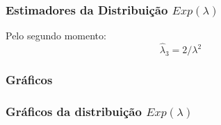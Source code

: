 \begin{frame}
\frametitle{Estimadores da Distribuição $Exp(\lambda)$}
Pelo segundo momento:
\begin{equation}
\label{eq:Exp_m_p3}
\hat{\lambda}_{3} = 2/\lambda^2
\end{equation}

\end{frame}


\subsubsection{Gráficos}
\begin{frame}
\frametitle{Gráficos da distribuição $Exp(\lambda)$}

\end{frame}



